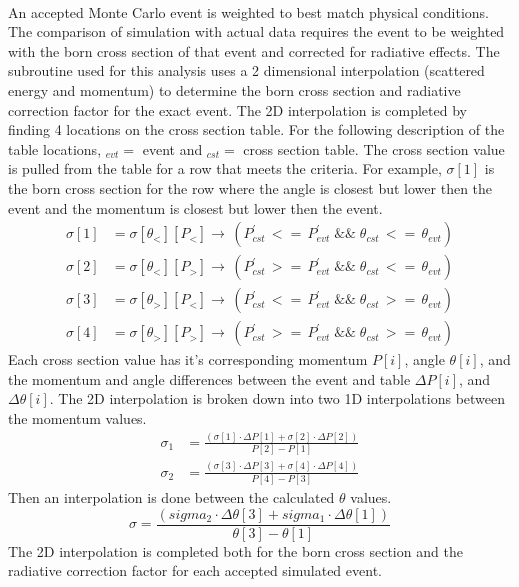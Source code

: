 \paragraph{}An accepted Monte Carlo event is weighted to best match physical conditions. The comparison of simulation with actual data requires the event to be weighted with the born cross section of that event and corrected for radiative effects. The subroutine used for this analysis uses a 2 dimensional interpolation (scattered energy and momentum) to determine the born cross section and radiative correction factor for the exact event. The 2D interpolation is completed by finding 4 locations on the cross section table. For the following description of the table locations, $_{evt} =$ event and $_{cst} =$ cross section table. The cross section value is pulled from the table for a row that meets the criteria. For example, $\sigma[1]$ is the born cross section for the row where the angle is closest but lower then the event and the momentum is closest but lower then the event. 
\begin{align}
 	\sigma[1] &=\sigma[\theta_<][P_<]\rightarrow\,(P^{\prime}_{cst}\, <=\, P^{\prime}_{evt}\; \&\& \;\theta_{cst}\, <=\, \theta_{evt}) \nonumber\\
	\sigma[2] &=\sigma[\theta_<][P_>]\rightarrow\,(P^{\prime}_{cst}\, >=\, P^{\prime}_{evt}\; \&\& \;\theta_{cst}\, <=\, \theta_{evt}) \nonumber\\
	\sigma[3] &=\sigma[\theta_>][P_<]\rightarrow\,(P^{\prime}_{cst}\, <=\, P^{\prime}_{evt}\; \&\& \;\theta_{cst}\, >=\, \theta_{evt}) \nonumber\\
	\sigma[4] &=\sigma[\theta_>][P_>]\rightarrow\,(P^{\prime}_{cst}\, >=\, P^{\prime}_{evt}\; \&\& \;\theta_{cst}\, >=\, \theta_{evt})
\end{align}
Each cross section value has it's corresponding momentum $P[i]$, angle $\theta[i]$, and the momentum and angle differences between the event and table  $\Delta P[i]$, and $\Delta \theta[i]$. The 2D interpolation is broken down into two 1D interpolations between the momentum values.
\begin{align}
\sigma_1 &= \frac{\left(\sigma[1] \cdot \Delta P[1] +  \sigma[2] \cdot \Delta P[2] \right)} {P[2]-P[1]}\nonumber\\
\sigma_2 &= \frac{\left(\sigma[3] \cdot \Delta P[3] +  \sigma[4] \cdot \Delta P[4] \right)} {P[4]-P[3]}
\end{align}
Then an interpolation is done between the calculated $\theta$ values.
\begin{equation}
\sigma = \frac{\left(sigma_2 \cdot \Delta \theta[3] + sigma_1 \cdot \Delta \theta[1]\right) }{\theta[3] -\theta[1]}
\end{equation}
The 2D interpolation is completed both for the born cross section and the radiative correction factor for each accepted simulated event.
